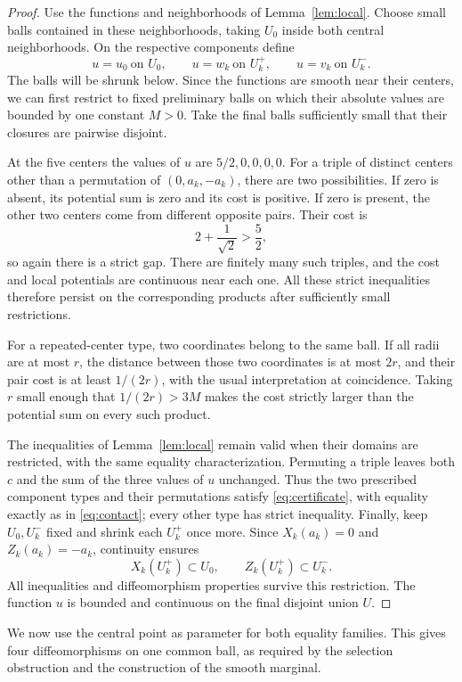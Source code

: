 \begin{proof}
Use the functions and neighborhoods of Lemma~\ref{lem:local}.
Choose small balls contained in these neighborhoods, taking
\(U_0\) inside both central neighborhoods. On the respective
components define
\[
 u=u_0\ \text{on }U_0,\qquad
 u=w_k\ \text{on }U_k^+,\qquad
 u=v_k\ \text{on }U_k^-.
\]
The balls will be shrunk below. Since the functions are smooth near
their centers, we can first restrict to fixed preliminary balls on
which their absolute values are bounded by one constant \(M>0\).
Take the final balls sufficiently small that their closures are
pairwise disjoint.

At the five centers the values of \(u\) are \(5/2,0,0,0,0\).
For a triple of distinct centers other than a permutation of
\((0,a_k,-a_k)\), there are two
possibilities. If zero is absent, its potential sum is zero and
its cost is positive. If zero is present, the other two centers
come from different opposite pairs. Their cost is
\[
 2+\frac1{\sqrt2}>\frac52,
\]
so again there is a strict gap. There are finitely many such
triples, and the cost and local potentials are continuous near
each one. All these strict inequalities therefore persist on
the corresponding products after sufficiently small restrictions.

For a repeated-center type, two coordinates belong to the same
ball. If all radii are at most \(r\), the distance between those
two coordinates is at most \(2r\), and their pair cost is at least
\(1/(2r)\), with the usual interpretation at coincidence.
Taking \(r\) small enough that \(1/(2r)>3M\) makes the cost
strictly larger than the potential sum on every such product.

The inequalities of Lemma~\ref{lem:local} remain valid when their
domains are restricted, with the same equality characterization.
Permuting a triple leaves both \(c\) and the sum of the three
values of \(u\) unchanged. Thus the two prescribed component types and
their permutations satisfy
\eqref{eq:certificate}, with equality exactly as in
\eqref{eq:contact}; every other type has strict inequality.
Finally, keep \(U_0,U_k^-\) fixed and shrink each \(U_k^+\) once
more. Since \(X_k(a_k)=0\) and \(Z_k(a_k)=-a_k\), continuity
ensures
\[
 X_k(U_k^+)\subset U_0,\qquad Z_k(U_k^+)\subset U_k^-.
\]
All inequalities and diffeomorphism properties survive this
restriction. The function \(u\) is bounded and continuous on
the final disjoint union \(U\).
\end{proof}

We now use the central point as parameter for both equality families.
This gives four diffeomorphisms on one common ball, as required by the
selection obstruction and the construction of the smooth marginal.

